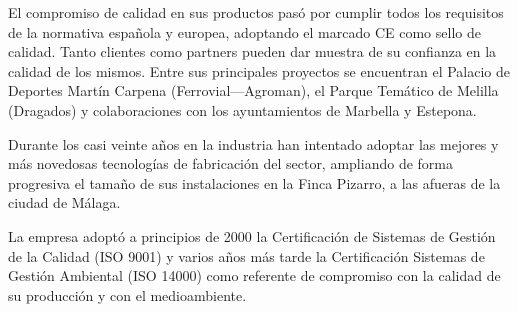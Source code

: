 El compromiso de calidad en sus productos pasó por cumplir todos los requisitos de la normativa española y europea, adoptando el marcado CE como sello de calidad. Tanto clientes como partners pueden dar muestra de su confianza en la calidad de los mismos. Entre sus principales proyectos se encuentran el Palacio de Deportes Martín Carpena (Ferrovial—Agroman), el Parque Temático de Melilla (Dragados) y colaboraciones con los ayuntamientos de Marbella y Estepona.

Durante los casi veinte años en la industria han intentado adoptar las mejores y más novedosas tecnologías de fabricación del sector, ampliando de forma progresiva el tamaño de sus instalaciones en la Finca Pizarro, a las afueras de la ciudad de Málaga.

La empresa adoptó a principios de 2000 la Certificación de Sistemas de Gestión de la Calidad (ISO 9001) y varios años más tarde la Certificación Sistemas de Gestión Ambiental (ISO 14000) como referente de compromiso con la calidad de su producción y con el medioambiente.
